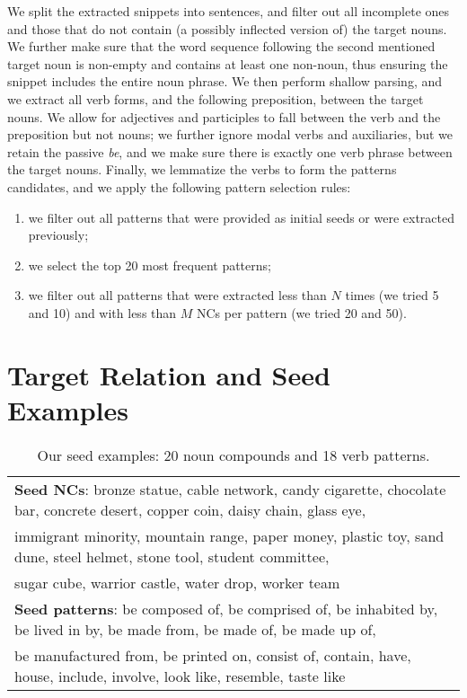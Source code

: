 \documentclass[letterpaper,11pt]{article}
\begin{document}
We  split  the  extracted  snippets into  sentences,  and  filter  out
all  incomplete  ones  and  those  that do  not  contain  (a  possibly
inflected  version  of)  the  target   nouns.  We  further  make  sure
that  the   word  sequence  following  the   second  mentioned  target
noun  is   non-empty  and  contains   at  least  one   non-noun,  thus
ensuring  the  snippet  includes  the  entire  noun  phrase.  We  then
perform
shallow parsing,
and we extract all verb  forms, and the following preposition, between
the  target nouns.  We allow  for adjectives  and participles  to fall
between the verb and the preposition but not nouns; we further ignore
modal  verbs and  auxiliaries, but  we retain  the passive  \emph{be},
and  we  make sure  there  is  exactly  one  verb phrase  between  the
target nouns.  Finally, we  lemmatize the verbs  to form  the patterns
candidates, and we apply the following pattern selection rules:

\begin{enumerate}
\item we filter out all patterns that were provided as initial seeds or were extracted previously;
\item we select the top 20 most frequent patterns;
\item we filter out all patterns that were extracted less than $N$ times (we tried 5 and 10) and with less than $M$ NCs per pattern (we tried 20 and 50).
\end{enumerate}


\section{Target Relation and Seed Examples}
\label{sec:data}


\begin{table*}[htb]
\footnotesize
\begin{center}
\begin{tabular}{|l|}
\hline
\textbf{Seed NCs}: bronze statue, cable network, candy cigarette, chocolate bar, concrete desert, copper coin, daisy chain, glass eye, \\
immigrant minority, mountain range, paper money, plastic toy, sand dune, steel helmet, stone tool, student committee, \\
sugar cube, warrior castle, water drop, worker team \\
\hline
\textbf{Seed patterns}: be composed of, be comprised of, be inhabited by, be lived in by, be made from, be made of, be made up of, \\
be manufactured from, be printed on, consist of, contain, have, house, include, involve, look like, resemble, taste like\\
\hline
\end{tabular}
\caption{Our seed examples: 20 noun compounds and 18 verb patterns.}
\label{tab:seed}
\end{center}
\end{table*}
\end{document}
